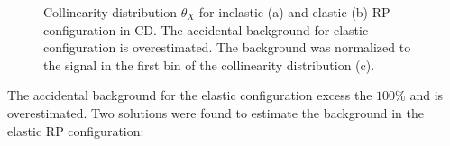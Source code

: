\begin{figure}[H]
{\begin{subfigure}[b]{\linewidth}{
				}
		\end{subfigure}
	}
	\parbox{0.48\textwidth}{
		\centering
		\begin{subfigure}[b]{\linewidth}{
				}
		\end{subfigure}
	}
	\caption[Collinearity distribution $\theta_X$ for inelastic and elastic RP configuration in CD]{Collinearity distribution $\theta_X$ for inelastic (a) and elastic (b) RP configuration in CD. The accidental background for elastic configuration is overestimated. The background was normalized to the signal in the first bin of the collinearity distribution (c).}
	\label{fig:CDcoll}
\end{figure}
The accidental background for the elastic configuration excess the $100\%$ and is overestimated. Two solutions were found to estimate the background in the elastic RP configuration:

